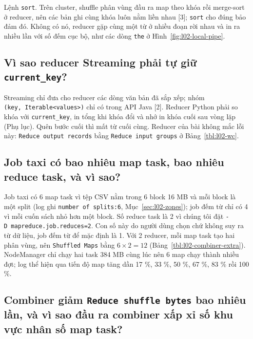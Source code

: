 \documentclass[
  12pt,
  a4paper,
]{article}
\begin{document}
Lệnh \texttt{sort}. Trên cluster, shuffle phân vùng đầu ra map theo khóa
rồi merge-sort ở reducer, nên các bản ghi cùng khóa luôn nằm liền nhau
{[}3{]}; \texttt{sort} cho đúng bảo đảm đó. Không có nó, reducer gặp
cùng một từ ở nhiều đoạn rời nhau và in ra nhiều lần với số đếm cục bộ,
như các dòng \texttt{the} ở Hình~\ref{fig:l02-local-pipe}.

\subsection{\texorpdfstring{Vì sao reducer Streaming phải tự giữ
\texttt{current\_key}?}{Vì sao reducer Streaming phải tự giữ current\_key?}}\label{sec:l02-q2}

Streaming chỉ đưa cho reducer các dòng văn bản đã sắp xếp; nhóm
\texttt{(key,}\allowbreak{}\texttt{\ Iterable\textless{}values\textgreater{})}\allowbreak{}
chỉ có trong API Java {[}2{]}. Reducer Python phải so khóa với
\texttt{current\_key}, in tổng khi khóa đổi và nhớ in khóa cuối sau vòng
lặp (Phụ lục). Quên bước cuối thì mất từ cuối cùng. Reducer của bài
không mắc lỗi này: \texttt{Reduce\ output\ records}\allowbreak{} bằng
\texttt{Reduce\ input\ groups}\allowbreak{} ở Bảng~\ref{tbl:l02-wc}.

\subsection{Job taxi có bao nhiêu map task, bao nhiêu reduce task, và vì
sao?}\label{sec:l02-q3}

Job taxi có 6 map task vì tệp CSV nằm trong 6 block 16 MB và mỗi block
là một split (log ghi
\texttt{number\ of\ splits:}\allowbreak{}\texttt{6}\allowbreak{},
Mục~\ref{sec:l02-zones}); job đếm từ chỉ có 4 vì mỗi cuốn sách nhỏ hơn
một block. Số reduce task là 2 vì chúng tôi đặt
\texttt{-D\ mapreduce.}\allowbreak{}\texttt{job.}\allowbreak{}\texttt{reduces=}\allowbreak{}\texttt{2}\allowbreak{}.
Con số này do người dùng chọn chứ không suy ra từ dữ liệu, job đếm từ để
mặc định là 1. Với 2 reducer, mỗi map task tạo hai phân vùng, nên
\texttt{Shuffled\ Maps} bằng \(6 \times 2 = 12\)
(Bảng~\ref{tbl:l02-combiner-extra}). NodeManager chỉ chạy hai task 384
MB cùng lúc nên 6 map chạy thành nhiều đợt; log thể hiện qua tiến độ map
tăng dần 17 \%, 33 \%, 50 \%, 67 \%, 83 \% rồi 100 \%.

\subsection{\texorpdfstring{Combiner giảm
\texttt{Reduce\ shuffle\ bytes}\allowbreak{} bao nhiêu lần, và vì sao
đầu ra combiner xấp xỉ số khu vực nhân số map
task?}{Combiner giảm Reduce shuffle bytes bao nhiêu lần, và vì sao đầu ra combiner xấp xỉ số khu vực nhân số map task?}}\label{sec:l02-q4}
\end{document}

